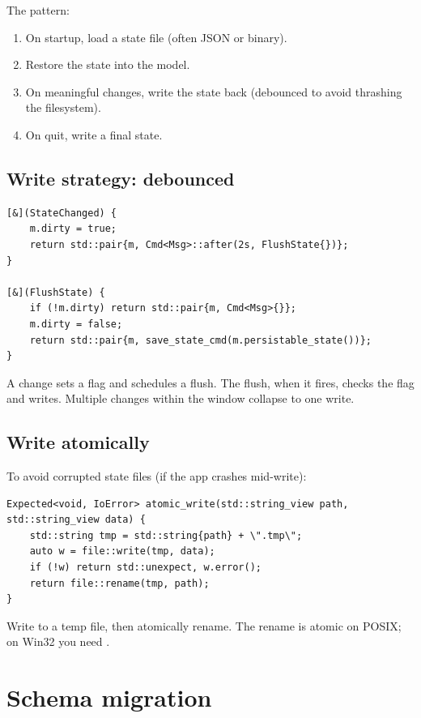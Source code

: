 The pattern:

\begin{enumerate}[leftmargin=*]
  \item On startup, load a state file (often JSON or binary).
  \item Restore the state into the model.
  \item On meaningful changes, write the state back (debounced
    to avoid thrashing the filesystem).
  \item On quit, write a final state.
\end{enumerate}

\subsection*{Write strategy: debounced}

\begin{lstlisting}
[&](StateChanged) {
    m.dirty = true;
    return std::pair{m, Cmd<Msg>::after(2s, FlushState{})};
}

[&](FlushState) {
    if (!m.dirty) return std::pair{m, Cmd<Msg>{}};
    m.dirty = false;
    return std::pair{m, save_state_cmd(m.persistable_state())};
}
\end{lstlisting}

A change sets a flag and schedules a flush. The flush, when it
fires, checks the flag and writes. Multiple changes within the
window collapse to one write.

\subsection*{Write atomically}

To avoid corrupted state files (if the app crashes mid-write):

\begin{lstlisting}
Expected<void, IoError> atomic_write(std::string_view path, std::string_view data) {
    std::string tmp = std::string{path} + \".tmp\";
    auto w = file::write(tmp, data);
    if (!w) return std::unexpect, w.error();
    return file::rename(tmp, path);
}
\end{lstlisting}

Write to a temp file, then atomically rename. The rename is
atomic on POSIX; on Win32 you need .

\section{Schema migration}

